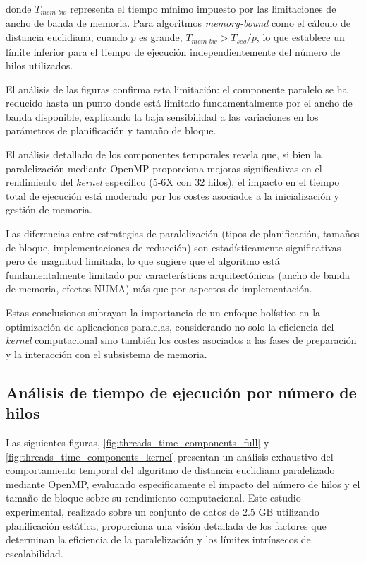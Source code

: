         donde $T_{mem\_bw}$ representa el tiempo mínimo impuesto por las limitaciones de ancho de banda de memoria. Para algoritmos \textit{memory-bound} como el cálculo de distancia euclidiana, cuando $p$ es grande, $T_{mem\_bw} > T_{seq}/p$, lo que establece un límite inferior para el tiempo de ejecución independientemente del número de hilos utilizados.
        
        El análisis de las figuras confirma esta limitación: el componente paralelo se ha reducido hasta un punto donde está limitado fundamentalmente por el ancho de banda disponible, explicando la baja sensibilidad a las variaciones en los parámetros de planificación y tamaño de bloque.
            
        El análisis detallado de los componentes temporales revela que, si bien la paralelización mediante OpenMP proporciona mejoras significativas en el rendimiento del \textit{kernel} específico (5-6X con 32 hilos), el impacto en el tiempo total de ejecución está moderado por los costes asociados a la inicialización y gestión de memoria. 
        
        Las diferencias entre estrategias de paralelización (tipos de planificación, tamaños de bloque, implementaciones de reducción) son estadísticamente significativas pero de magnitud limitada, lo que sugiere que el algoritmo está fundamentalmente limitado por características arquitectónicas (ancho de banda de memoria, efectos NUMA) más que por aspectos de implementación.
        
        Estas conclusiones subrayan la importancia de un enfoque holístico en la optimización de aplicaciones paralelas, considerando no solo la eficiencia del \textit{kernel} computacional sino también los costes asociados a las fases de preparación y la interacción con el subsistema de memoria.
        
    \subsection{Análisis de tiempo de ejecución por número de hilos}

       Las siguientes figuras, \autoref{fig:threads_time_components_full} y \autoref{fig:threads_time_components_kernel} presentan un análisis exhaustivo del comportamiento temporal del algoritmo de distancia euclidiana paralelizado mediante OpenMP, evaluando específicamente el impacto del número de hilos y el tamaño de bloque sobre su rendimiento computacional. Este estudio experimental, realizado sobre un conjunto de datos de 2.5 GB utilizando planificación estática, proporciona una visión detallada de los factores que determinan la eficiencia de la paralelización y los límites intrínsecos de escalabilidad.

